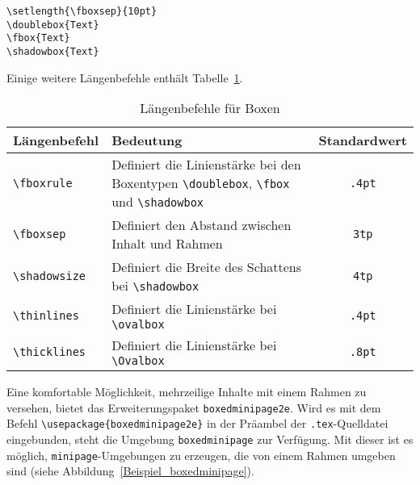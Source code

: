 \begin{minipage}[c]{0.5\textwidth}
\setlength{\parskip}{1em}
\setlength{\fboxsep}{10pt}
\hspace{5mm}
\hspace{5mm}
\hspace{5mm}
\hfill
\end{minipage}
\hfill
\begin{minipage}[c]{0.48\textwidth}
\setlength{\parskip}{2em}
\begin{lstlisting}[label=tabularmultirow8, style=customlatex]
\setlength{\fboxsep}{10pt}
\doublebox{Text} 
\fbox{Text}
\shadowbox{Text}
\end{lstlisting}
\end{minipage}

Einige weitere Längenbefehle enthält Tabelle~\ref{Tabelle_LaengenbefehleBoxen}.

\begin{table}[h!tb]
\centering
\caption{Längenbefehle für Boxen}
\label{Tabelle_LaengenbefehleBoxen}       %
\begin{tabularx}{\textwidth}{lXc}
\hline
Längenbefehl & Bedeutung &  Standardwert \\
\hline
\texttt{\textbackslash fboxrule} & Definiert die Linienstärke bei den Boxentypen \texttt{\textbackslash doublebox}, \texttt{\textbackslash fbox} und \texttt{\textbackslash shadowbox}  & \texttt{.4pt} \\
\texttt{\textbackslash fboxsep} & Definiert den Abstand zwischen Inhalt und Rahmen & \texttt{3tp} \\
\texttt{\textbackslash shadowsize} & Definiert die Breite des Schattens bei \texttt{\textbackslash shadowbox} & \texttt{4tp} \\
\texttt{\textbackslash thinlines} & Definiert die Linienstärke bei \texttt{\textbackslash ovalbox} &  \texttt{.4pt} \\
\texttt{\textbackslash thicklines} & Definiert die Linienstärke bei \texttt{\textbackslash Ovalbox} &  \texttt{.8pt}  \\
\hline
\end{tabularx}
\end{table}

Eine komfortable Möglichkeit, mehrzeilige Inhalte mit einem Rahmen zu versehen, bietet das Erweiterungspaket \verb!boxedminipage2e!. Wird es mit dem Befehl \verb!\usepackage{boxedminipage2e}! in der Präambel der \verb!.tex!-Quelldatei eingebunden, steht die 
Umgebung \verb!boxedminipage! zur Verfügung. Mit dieser ist es möglich, 
\verb!minipage!-Umgebungen zu erzeugen, die von einem Rahmen umgeben sind (siehe Abbildung~\ref{Beispiel_boxedminipage}). 

